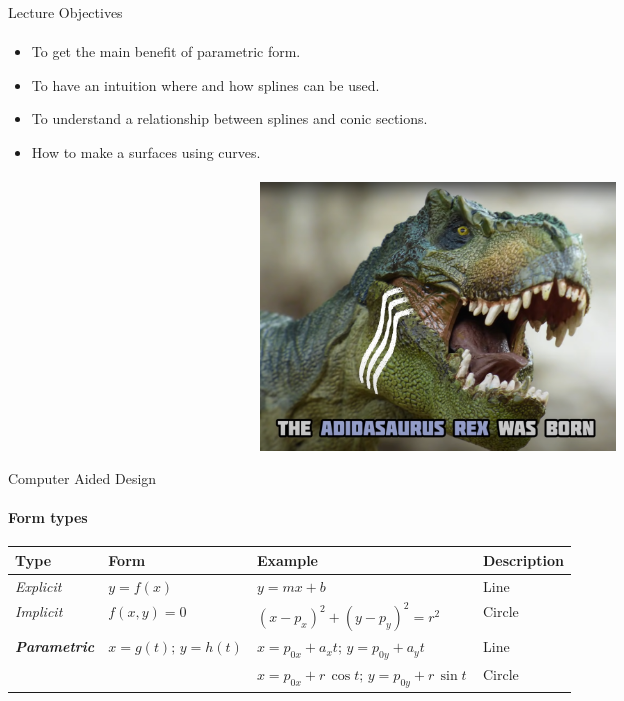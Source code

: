 \documentclass[aspectratio=169]{beamer}
\begin{document}
\begin{frame}[t]{Lecture Objectives}
    \framesubtitle{}
    \begin{itemize}
        \item To get the main benefit of parametric form.
        \item To have an intuition where and how splines can be used.
        \item To understand a relationship between splines and conic sections.
        \item How to make a surfaces using curves.
    \end{itemize}
\end{frame}

\begin{frame}[t]{}
\framesubtitle{}
    \begin{figure}[H]
        \centering\includegraphics[height=7.1cm,width=1\textwidth,keepaspectratio]{adidasaurus.png}
        \label{fig:adidasaurus.png}
    \end{figure}
\end{frame}

\begin{frame}[t]{Computer Aided Design}
    \framesubtitle{Form types}
    \begin{table}[H]
        \centering
        \begin{tabular}{llll}
        \textbf{Type} & \textbf{Form} & \textbf{Example} & \textbf{Description} \\ 
        \hline
        \textit{Explicit} & $y=f(x)\,\!$ & $y=mx+b\,\!$ & Line \\
        \textit{Implicit} & $f(x,y)=0\,\!$ & $\left(x-p_{x}\right)^{2}+\left(y-p_{y}\right)^{2}=r^{2}$ & Circle \\
        \multirow{2}{*}{\textit{\textbf{Parametric}}} & \multirow{2}{*}{${\displaystyle x={{g(t)}};\,\!} {\displaystyle y={{h(t)}}}$} & $x=p_{0x}+a_{x}t;\,\! {\displaystyle y=p_{0y}+a_{y}t\,\!}$ & Line \\
         &  & $x=p_{0x}+r\,\cos t;\,\! {\displaystyle y=p_{0y}+r\,\sin t\,\!}$ & Circle
        \end{tabular}
        \end{table}
    \end{frame}
\end{document}
